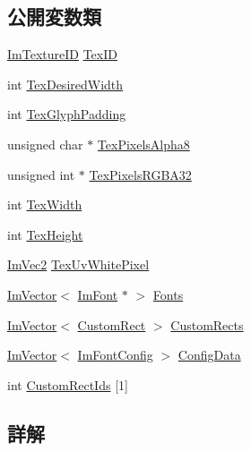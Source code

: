 \subsection*{公開変数類}
\begin{DoxyCompactItemize}
\item 
\mbox{\hyperlink{imgui_8h_a364f4447ecbc4ca176145ccff9db6286}{Im\+Texture\+ID}} \mbox{\hyperlink{struct_im_font_atlas_a1d7be9a6190c75706f80bda16c87f28e}{Tex\+ID}}
\item 
int \mbox{\hyperlink{struct_im_font_atlas_aa1d62d7da5633f894dbe881547e9de7c}{Tex\+Desired\+Width}}
\item 
int \mbox{\hyperlink{struct_im_font_atlas_a32034b2aac4616d8c27ee666a1fd1b62}{Tex\+Glyph\+Padding}}
\item 
unsigned char $\ast$ \mbox{\hyperlink{struct_im_font_atlas_a443ea9e7c4cf85ee791ffe891280eff3}{Tex\+Pixels\+Alpha8}}
\item 
unsigned int $\ast$ \mbox{\hyperlink{struct_im_font_atlas_a41163489a5b8060f405c56e22590cba5}{Tex\+Pixels\+R\+G\+B\+A32}}
\item 
int \mbox{\hyperlink{struct_im_font_atlas_a2d0662502433e7a87b3aa4681ba17aa3}{Tex\+Width}}
\item 
int \mbox{\hyperlink{struct_im_font_atlas_a5ef74d37ec01d9e8aac5c57433296ce3}{Tex\+Height}}
\item 
\mbox{\hyperlink{struct_im_vec2}{Im\+Vec2}} \mbox{\hyperlink{struct_im_font_atlas_af1d05221e9a1607d7f625df92a4f9b7e}{Tex\+Uv\+White\+Pixel}}
\item 
\mbox{\hyperlink{class_im_vector}{Im\+Vector}}$<$ \mbox{\hyperlink{struct_im_font}{Im\+Font}} $\ast$ $>$ \mbox{\hyperlink{struct_im_font_atlas_a0198aeb17ef8bb810ccc8db103b93b1f}{Fonts}}
\item 
\mbox{\hyperlink{class_im_vector}{Im\+Vector}}$<$ \mbox{\hyperlink{struct_im_font_atlas_1_1_custom_rect}{Custom\+Rect}} $>$ \mbox{\hyperlink{struct_im_font_atlas_a6289931d958f734fdc2ac1fadec99577}{Custom\+Rects}}
\item 
\mbox{\hyperlink{class_im_vector}{Im\+Vector}}$<$ \mbox{\hyperlink{struct_im_font_config}{Im\+Font\+Config}} $>$ \mbox{\hyperlink{struct_im_font_atlas_afa4f7459807763d032fe2d0022fc0823}{Config\+Data}}
\item 
int \mbox{\hyperlink{struct_im_font_atlas_a608ad12c2ccf1eed97b63454e52ccbe8}{Custom\+Rect\+Ids}} \mbox{[}1\mbox{]}
\end{DoxyCompactItemize}


\subsection{詳解}



